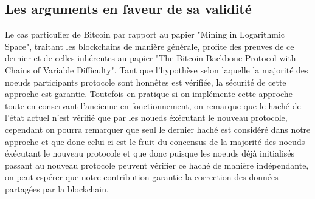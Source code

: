 \documentclass{article}
\newenvironment{point}[1]%
{\subsection*{#1}}%
{}
\begin{document}
\begin{point}{Les arguments en faveur de sa validité}

	Le cas particulier de Bitcoin par rapport au papier "Mining in Logarithmic Space", traitant les blockchains de manière générale, profite des preuves de ce dernier et de celles inhérentes au papier "The Bitcoin Backbone Protocol with Chains of Variable Difficulty". Tant que l'hypothèse selon laquelle la majorité des noeuds participants protocole sont honnêtes est vérifiée, la sécurité de cette approche est garantie. Toutefois en pratique si on implémente cette approche toute en conservant l'ancienne en fonctionnement, on remarque que le haché de l'état actuel n'est vérifié que par les noueds éxécutant le nouveau protocole, cependant on pourra remarquer que seul le dernier haché est considéré dans notre approche et que donc celui-ci est le fruit du concensus de la majorité des noeuds éxécutant le nouveau protocole et que donc puisque les noeuds déjà initialisés passant au nouveau protocole peuvent vérifier ce haché de manière indépendante, on peut espérer que notre contribution garantie la correction des données partagées par la blockchain.\\


\end{point}
\end{document}

